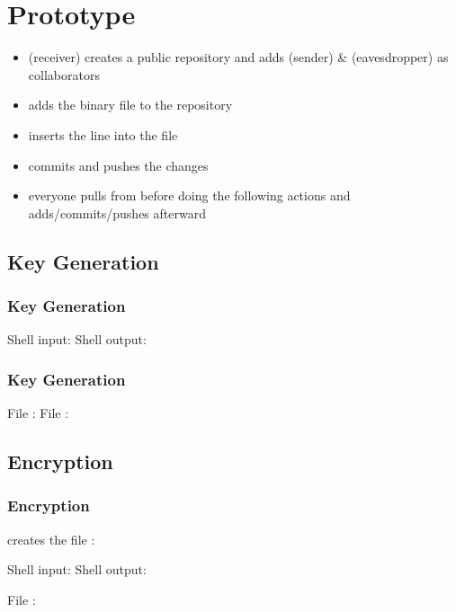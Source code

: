 \section{Prototype}


\begin{frame}
\begin{itemize}
\item \bob{} (receiver)
  creates a public \github{} repository and
  adds \alice{} (sender) \& \eve{} (eavesdropper)
  as collaborators
\item \bob{} adds the binary file \cryout{}
  to the repository
\item \bob{} inserts the line 
  into the file 
\item \bob{} commits and pushes the changes
\item everyone pulls from \github{}
  before doing the following actions
  and adds/commits/pushes afterward
\end{itemize}
\end{frame}


\subsection{Key Generation}

\begin{frame}
\frametitle{Key Generation}
Shell input: \generatekeysindemo
Shell output: \generatekeysoutdemo
\end{frame}

\begin{frame}
\frametitle{Key Generation}
File \private{\bobdemo}:
  \codestt{}
File \public{\bobdemo}:
  \codestt{}
\end{frame}


\subsection{Encryption}

\begin{frame}
\frametitle{Encryption}

\alice{} creates the file \private{\alicedemo}:
\codestt{}

Shell input: \encryptindemo
Shell output: \encryptoutdemo

File \public{\alicedemo}:
\codestt{}


\end{frame}

